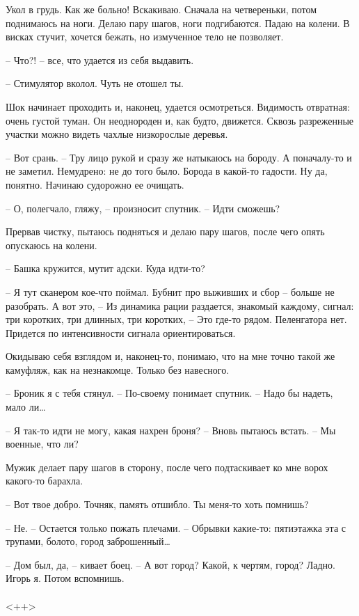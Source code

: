 \documentclass[a4paper]{book}
\begin{document}
Укол в грудь. Как же больно! Вскакиваю. Сначала на четвереньки, потом поднимаюсь на ноги. Делаю пару шагов, ноги подгибаются. Падаю на колени. В висках стучит, хочется бежать, но измученное тело не позволяет.

-- Что?! -- все, что удается из себя выдавить.

-- Стимулятор вколол. Чуть не отошел ты. 

Шок начинает проходить и, наконец, удается осмотреться. Видимость отвратная: очень густой туман. Он неоднороден и, как будто, движется. Сквозь разреженные участки можно видеть чахлые низкорослые деревья. 

-- Вот срань. -- Тру лицо рукой и сразу же натыкаюсь на бороду. А поначалу-то и не заметил. Немудрено: не до того было. Борода в какой-то гадости. Ну да, понятно. Начинаю судорожно ее очищать. 

-- О, полегчало, гляжу, -- произносит спутник. -- Идти сможешь? 

Прервав чистку, пытаюсь подняться и делаю пару шагов, после чего опять опускаюсь на колени.

-- Башка кружится, мутит адски. Куда идти-то?

-- Я тут сканером кое-что поймал. Бубнит  про выживших и сбор -- больше не разобрать. А вот это, -- Из динамика рации раздается, знакомый каждому, сигнал: три коротких, три длинных, три коротких, -- Это где-то рядом. Пеленгатора нет. Придется по интенсивности сигнала ориентироваться. 

Окидываю себя взглядом и, наконец-то, понимаю, что на мне точно такой же камуфляж, как на незнакомце. Только без навесного.

-- Броник я с тебя стянул. -- По-своему понимает спутник. -- Надо бы надеть, мало ли\ldots

-- Я так-то идти не могу, какая нахрен броня? -- Вновь пытаюсь встать. -- Мы военные, что ли?

Мужик делает пару шагов в сторону, после чего подтаскивает ко мне ворох какого-то барахла.

-- Вот твое добро. Точняк, память отшибло. Ты меня-то хоть помнишь?

-- Не. -- Остается только пожать плечами. -- Обрывки какие-то: пятиэтажка эта с трупами, болото, город заброшенный\ldots

-- Дом был, да, -- кивает боец. -- А вот город? Какой, к чертям, город? Ладно. Игорь я. Потом вспомнишь. 

\paragraph{}<++>
\end{document}
